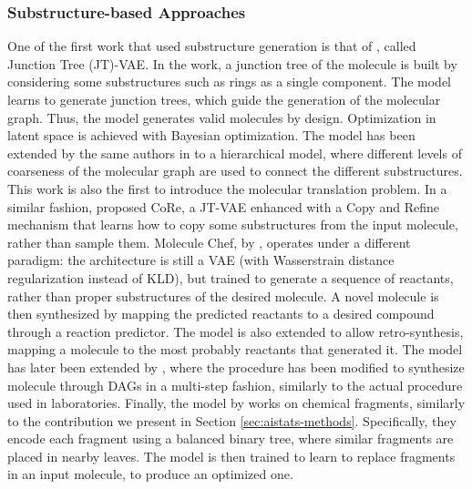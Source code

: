 \subsubsection*{Substructure-based Approaches}
One of the first work that used substructure generation is that of \citet{jin2018jtvae}, called Junction Tree (JT)-VAE. In the work, a junction tree of the molecule is built by considering some substructures such as rings as a single component. The model learns to generate junction trees, which guide the generation of the molecular graph. Thus, the model generates valid molecules by design. Optimization in latent space is achieved with Bayesian optimization. The model has been extended by the same authors in \citep{jin2019multimodalmoltranslation} to a hierarchical model, where different levels of coarseness of the molecular graph are used to connect the different substructures. This work is also the first to introduce the molecular translation problem. In a similar fashion, \citet{fu2020core} proposed CoRe, a JT-VAE enhanced with a Copy and Refine mechanism that learns how to copy some substructures from the input molecule, rather than sample them. Molecule Chef, by \citet{bradshaw2019moleculechef}, operates under a different paradigm: the architecture is still a VAE (with Wasserstrain distance regularization instead of KLD), but trained to generate a sequence of reactants, rather than proper substructures of the desired molecule. A novel molecule is then synthesized by mapping the predicted reactants to a desired compound through a reaction predictor. The model is also extended to allow retro-synthesis, \ie mapping a molecule to the most probably reactants that generated it. The model has later been extended by \citet{bradshaw2020barking}, where the procedure has been modified to synthesize molecule through DAGs in a multi-step fashion, similarly to the actual procedure used in laboratories. Finally, the model by \citet{bostrom2019fragments} works on chemical fragments, similarly to the contribution we present in Section \ref{sec:aistats-methods}. Specifically, they encode each fragment using a balanced binary tree, where similar fragments are placed in nearby leaves. The model is then trained to learn to replace fragments in an input molecule, to produce an optimized one.

